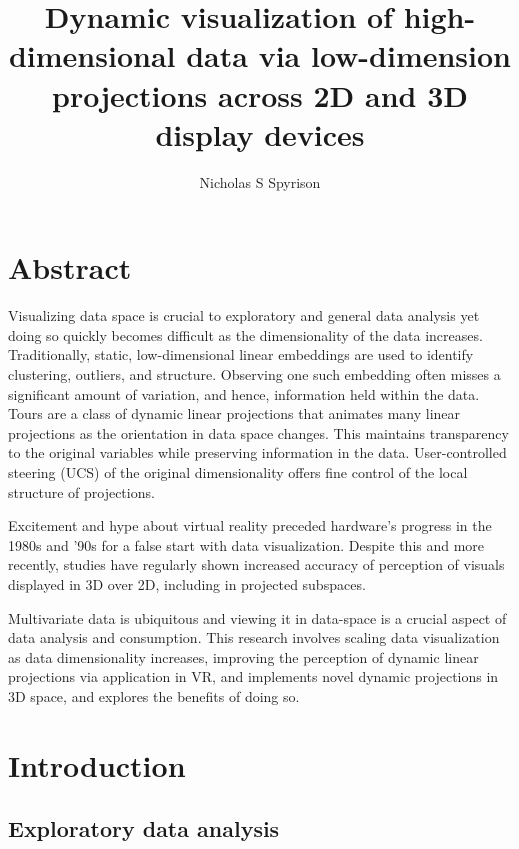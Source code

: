 \documentclass{monashthesis}
\author{Nicholas S Spyrison}
\title{Dynamic visualization of high-dimensional data via low-dimension
projections across 2D and 3D display devices}
\begin{document}

\titlepage

{\sf\tighttoc\doublespacing}

\chapter*{Abstract}\label{abstract}

Visualizing data space is crucial to exploratory and general data
analysis yet doing so quickly becomes difficult as the dimensionality of
the data increases. Traditionally, static, low-dimensional linear
embeddings are used to identify clustering, outliers, and structure.
Observing one such embedding often misses a significant amount of
variation, and hence, information held within the data. Tours are a
class of dynamic linear projections that animates many linear
projections as the orientation in data space changes. This maintains
transparency to the original variables while preserving information in
the data. User-controlled steering (UCS) of the original dimensionality
offers fine control of the local structure of projections.

Excitement and hype about virtual reality preceded hardware's progress
in the 1980s and '90s for a false start with data visualization. Despite
this and more recently, studies have regularly shown increased accuracy
of perception of visuals displayed in 3D over 2D, including in projected
subspaces.

Multivariate data is ubiquitous and viewing it in data-space is a
crucial aspect of data analysis and consumption. This research involves
scaling data visualization as data dimensionality increases, improving
the perception of dynamic linear projections via application in VR, and
implements novel dynamic projections in 3D space, and explores the
benefits of doing so.

\clearpage{}\setcounter{page}{0}

\chapter{Introduction}\label{ch:introduction}

\section{Exploratory data analysis}\label{exploratory-data-analysis}
\end{document}
